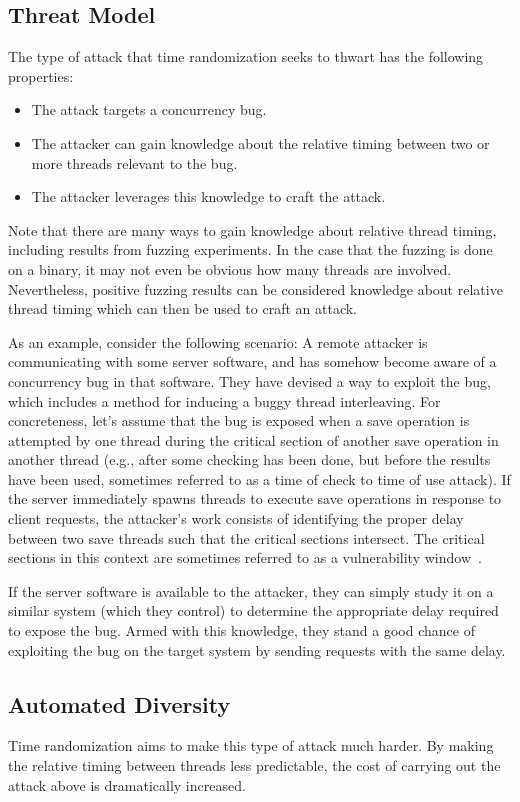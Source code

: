 \subsection{Threat Model}
The type of attack that time randomization seeks to thwart has the following properties:
\begin{itemize}
	\item The attack targets a concurrency bug.
	\item The attacker can gain knowledge about the relative timing between two
  or more threads relevant to the bug.
	\item The attacker leverages this knowledge to craft the attack.
\end{itemize}
Note that there are many ways to gain knowledge about relative thread timing, including results from fuzzing experiments.
In the case that the fuzzing is done on a binary, it may not even be obvious how many threads are involved.
Nevertheless, positive fuzzing results can be considered knowledge about relative thread timing which can then be used to craft an attack.

As an example, consider the following scenario:
A remote attacker is communicating with some server software, and has somehow become aware of a concurrency bug in that software.
They have devised a way to exploit the bug, which includes a method for inducing a buggy thread interleaving.
For concreteness, let's assume that the bug is exposed when a save operation
is attempted by one thread during the critical section of another save
operation in another thread (e.g., after some checking has been done, but before the results have been used, sometimes referred to as a time of check to time of use attack).
If the server immediately spawns threads to execute save operations in response to client requests, the attacker's work consists of identifying the proper delay between two save threads such that the critical sections intersect.
The critical sections in this context are sometimes referred to as a vulnerability window~\cite{Yang2012}.

If the server software is available to the attacker, they can simply study it on a similar system (which they control) to determine the appropriate delay required to expose the bug.
Armed with this knowledge, they stand a good chance of exploiting the bug on the target system by sending requests with the same delay.
\subsection{Automated Diversity}\label{automated-diversity}
Time randomization aims to make this type of attack much harder.
By making the relative timing between threads less predictable, the cost of carrying out the attack above is dramatically increased.

